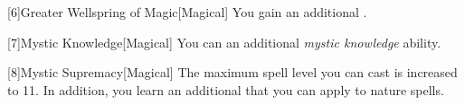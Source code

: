         [6]{Greater Wellspring of Magic}[Magical]
        You gain an additional .

        [7]{Mystic Knowledge}[Magical]
        You can an additional \textit{mystic knowledge} ability.

        [8]{Mystic Supremacy}[Magical]
        The maximum spell level you can cast is increased to 11.
        In addition, you learn an additional  that you can apply to nature spells.


